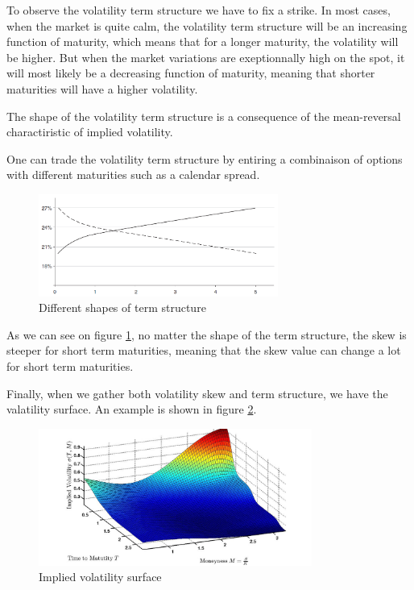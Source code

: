 \documentclass[hidelinks]{article}
\theoremstyle{definition}
\begin{document}
   To observe the volatility term structure we have to fix a strike. In most cases, when the market is quite calm, the volatility term structure will be an increasing function of maturity, which means that for a longer maturity, the volatility will be higher. But when the market variations are exeptionnally high on the spot, it will most likely be a decreasing function of maturity, meaning that shorter maturities will have a higher volatility.
   
   The shape of the volatility term structure is a consequence of the mean-reversal charactiristic of implied volatility.
   
   One can trade the volatility term structure by entiring a combinaison of options with different maturities such as a calendar spread.
   
   \begin{figure}[!h]
	\centering
	\includegraphics[width=0.7\textwidth]{term_structure.png}
    \caption{Different shapes of term structure}
    \label{fig:term}
    \end{figure}
    
   
    
    As we can see on figure \ref{fig:term}, no matter the shape of the term structure, the skew is steeper for short term maturities, meaning that the skew value can change a lot for short term maturities.
    
    Finally, when we gather both volatility skew and term structure, we have the valatility surface. An example is shown in figure \ref{fig:surface}.
    
     \begin{figure}[!h]
	\centering
	\includegraphics[width=0.8\textwidth]{vol_surface.jpg}
    \caption{Implied volatility surface}
    \label{fig:surface}
    \end{figure}
   \newpage
\appendix
\end{document}
